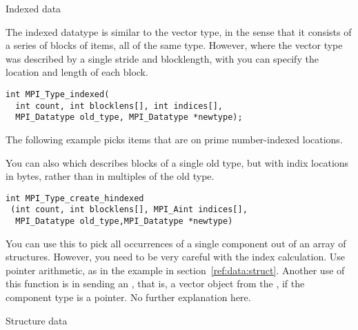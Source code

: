  {Indexed data}

The indexed datatype is similar to the vector type, in the sense that it consists
of a series of blocks of items, all of the same type. However, where the
vector type was described by a single stride and blocklength,
with 
you can specify the location and length of each block.
\begin{verbatim}
int MPI_Type_indexed(
  int count, int blocklens[], int indices[],
  MPI_Datatype old_type, MPI_Datatype *newtype);
\end{verbatim}
The following example picks items that are on prime number-indexed
locations.

You can also  which describes blocks
of a single old type, but with indix locations in bytes, rather than
in multiples of the old type.
\begin{verbatim}
int MPI_Type_create_hindexed
 (int count, int blocklens[], MPI_Aint indices[],
  MPI_Datatype old_type,MPI_Datatype *newtype)
\end{verbatim}
You can use this to pick all occurrences of a single component out of
an array of structures. However, you need to be very careful with the
index calculation. Use pointer arithmetic, as in the example in
section~\ref{ref:data:struct}.  Another use of this function is in
sending an , that
is, a vector object from the , if
the component type is a pointer. No further explanation here.

 {Structure data}

